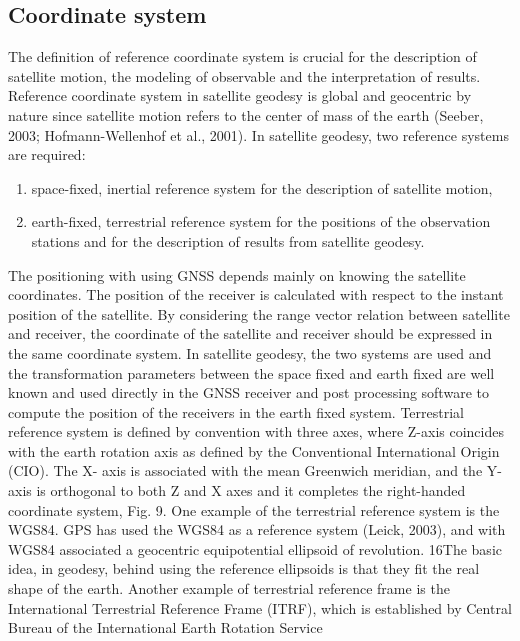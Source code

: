 \subsection{Coordinate system}
The definition of reference coordinate system is crucial for the description of satellite motion,
the modeling of observable and the interpretation of results.
Reference coordinate system in satellite geodesy is global and geocentric by nature since 
satellite motion refers to the center of mass of the earth 
(Seeber, 2003; Hofmann-Wellenhof et al., 2001).
In satellite geodesy, two reference systems are required:
\begin{enumerate}
	\item space-fixed, inertial reference system for the description of satellite motion,
	\item earth-fixed, terrestrial reference system for the positions of the observation stations
		and for the description of results from satellite geodesy.
\end{enumerate}
The positioning with using GNSS depends mainly on knowing the satellite coordinates. 
The position of the receiver is calculated with respect to the instant position of the satellite. 
By considering the range vector relation between satellite and receiver, 
the coordinate of the satellite and receiver should be expressed in the same coordinate system.
In satellite geodesy, the two systems are used and the transformation parameters between the
space fixed and earth fixed are well known and used directly in the GNSS receiver and post
processing software to compute the position of the receivers in the earth fixed system.
Terrestrial reference system is defined by convention with three axes, where Z-axis coincides
with the earth rotation axis as defined by the Conventional International Origin (CIO). The X-
axis is associated with the mean Greenwich meridian, and the Y-axis is orthogonal to both Z and
X axes and it completes the right-handed coordinate system, Fig. 9. One example of the
terrestrial reference system is the WGS84. GPS has used the WGS84 as a reference system
(Leick, 2003), and with WGS84 associated a geocentric equipotential ellipsoid of revolution.
16The basic idea, in geodesy, behind using the reference ellipsoids is that they fit the real
shape of the earth.
Another example of terrestrial reference frame is the International Terrestrial Reference Frame
(ITRF), which is established by Central Bureau of the International Earth Rotation Service
